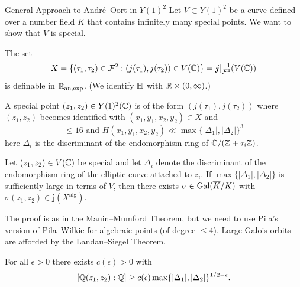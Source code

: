 \documentclass{beamer}
\begin{document}
\begin{frame}{General Approach to Andr\'e--Oort in $Y(1)^2$}
  Let $V\subset Y(1)^2$ be a curve defined over a number field $K$
  that contains infinitely many special points.
  We want to show that $V$ is special.
  
  The set
  \begin{equation}
    \label{def:Xao}
    X = \{(\tau_1,\tau_2) \in {\mathcal F}^2 : (j(\tau_1),j(\tau_2)) \in V({\mathbb{C}}) \} =
    \boldsymbol{j}|_{{\mathcal F}^2}^{-1}(V({\mathbb{C}}))
  \end{equation}
  is \alert{definable} in ${{\mathbb{R}}_{\mathrm{an,exp}}}$. (We identify ${\mathbb{H}}$ with
  ${\mathbb{R}}\times(0,\infty)$.)

  
  A special point $(z_1,z_2) \in Y(1)^2({\mathbb{C}})$ is of the form
  $(j(\tau_1),j(\tau_2))$ where  $(z_1,z_2)$ becomes identified with
  $(x_1,y_1,x_2,y_2) \in X$ and
  \begin{equation*}
    [\IQ(x_1,y_1,x_2,y_2):\IQ]\le 16\text{ and }
    H(x_1,y_1,x_2,y_2) \ll \max\{|\Delta_1|,|\Delta_2|\}^3
  \end{equation*}
  here $\Delta_i$ is the discriminant of the endomorphism ring
  of ${\mathbb{C}}/({\mathbb{Z}}+\tau_i{\mathbb{Z}})$. 
\end{frame}

\begin{frame}
  \begin{lemma}
    Let $(z_1,z_2)\in V({\mathbb{C}})$ be special and let $\Delta_i$ denote the discriminant
    of the endomorphism ring of the elliptic curve attached to $z_i$.
    If $\max\{|\Delta_1|,|\Delta_2|\}$ is sufficiently large in terms of
    $V$, then there exists $\sigma\in \mathrm{Gal}(\overline{K}/K)$ with
    $\sigma(z_1,z_2)\in \boldsymbol{j}(X^{\mathrm{alg}})$.   
  \end{lemma}
  
  The proof is as in the Manin--Mumford Theorem, but we need to use
  Pila's version of Pila--Wilkie for algebraic points (of degree $\le
  4$).
  Large Galois orbits are afforded by the \alert{Landau--Siegel}
  Theorem.

  \begin{theorem}
    For all $\epsilon > 0$ there exists $c(\epsilon)>0$ with
    $$[{\mathbb{Q}}(z_1,z_2):{\mathbb{Q}}] \ge c(\epsilon)
    \max\{|\Delta_1|,|\Delta_2|\}^{1/2-\epsilon}.$$
  \end{theorem}
\end{frame}
\end{document}

